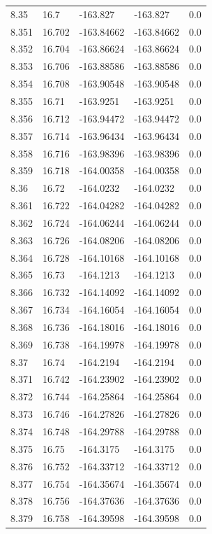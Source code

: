 \begin{tabular}{lllll}
8.35 & 16.7 & -163.827 & -163.827 & 0.0 \\
8.351 & 16.702 & -163.84662 & -163.84662 & 0.0 \\
8.352 & 16.704 & -163.86624 & -163.86624 & 0.0 \\
8.353 & 16.706 & -163.88586 & -163.88586 & 0.0 \\
8.354 & 16.708 & -163.90548 & -163.90548 & 0.0 \\
8.355 & 16.71 & -163.9251 & -163.9251 & 0.0 \\
8.356 & 16.712 & -163.94472 & -163.94472 & 0.0 \\
8.357 & 16.714 & -163.96434 & -163.96434 & 0.0 \\
8.358 & 16.716 & -163.98396 & -163.98396 & 0.0 \\
8.359 & 16.718 & -164.00358 & -164.00358 & 0.0 \\
8.36 & 16.72 & -164.0232 & -164.0232 & 0.0 \\
8.361 & 16.722 & -164.04282 & -164.04282 & 0.0 \\
8.362 & 16.724 & -164.06244 & -164.06244 & 0.0 \\
8.363 & 16.726 & -164.08206 & -164.08206 & 0.0 \\
8.364 & 16.728 & -164.10168 & -164.10168 & 0.0 \\
8.365 & 16.73 & -164.1213 & -164.1213 & 0.0 \\
8.366 & 16.732 & -164.14092 & -164.14092 & 0.0 \\
8.367 & 16.734 & -164.16054 & -164.16054 & 0.0 \\
8.368 & 16.736 & -164.18016 & -164.18016 & 0.0 \\
8.369 & 16.738 & -164.19978 & -164.19978 & 0.0 \\
8.37 & 16.74 & -164.2194 & -164.2194 & 0.0 \\
8.371 & 16.742 & -164.23902 & -164.23902 & 0.0 \\
8.372 & 16.744 & -164.25864 & -164.25864 & 0.0 \\
8.373 & 16.746 & -164.27826 & -164.27826 & 0.0 \\
8.374 & 16.748 & -164.29788 & -164.29788 & 0.0 \\
8.375 & 16.75 & -164.3175 & -164.3175 & 0.0 \\
8.376 & 16.752 & -164.33712 & -164.33712 & 0.0 \\
8.377 & 16.754 & -164.35674 & -164.35674 & 0.0 \\
8.378 & 16.756 & -164.37636 & -164.37636 & 0.0 \\
8.379 & 16.758 & -164.39598 & -164.39598 & 0.0 \\

\end{tabular}
